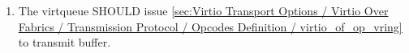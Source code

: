 \begin{enumerate}
\item The virtqueue SHOULD issue \ref{sec:Virtio Transport Options / Virtio Over Fabrics / Transmission Protocol / Opcodes Definition / virtio_of_op_vring}~ to transmit buffer.
\end{enumerate}
